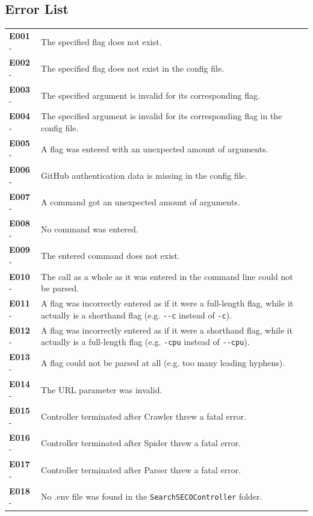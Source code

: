 \documentclass{article}
\begin{document}
\subsection{Error List}
\par \vspace{.5cm}
\begin{tabularx}{\textwidth}{lX}
    \textbf{E001} - & The specified flag does not exist. \\
    \textbf{E002} - & The specified flag does not exist in the config file. \\
    \textbf{E003} - & The specified argument is invalid for its corresponding flag. \\
    \textbf{E004} - & The specified argument is invalid for its corresponding flag in the config file. \\
    \textbf{E005} - & A flag was entered with an unexpected amount of arguments. \\
    \textbf{E006} - & GitHub authentication data is missing in the config file. \\
    \textbf{E007} - & A command got an unexpected amount of arguments. \\
    \textbf{E008} - & No command was entered. \\
    \textbf{E009} - & The entered command does not exist. \\
    \textbf{E010} - & The call as a whole as it was entered in the command line could not be parsed. \\
    \textbf{E011} - & A flag was incorrectly entered as if it were a full-length flag, while it actually is a shorthand flag (e.g. \texttt{-{}-c} instead of \texttt{-c}). \\
    \textbf{E012} - & A flag was incorrectly entered as if it were a shorthand flag, while it actually is a full-length flag (e.g. \texttt{-cpu} instead of \texttt{-{}-cpu}). \\
    \textbf{E013} - & A flag could not be parsed at all (e.g. too many leading hyphens). \\
    \textbf{E014} - & The URL parameter was invalid. \\
    \textbf{E015} - & Controller terminated after Crawler threw a fatal error. \\
    \textbf{E016} - & Controller terminated after Spider threw a fatal error. \\
    \textbf{E017} - & Controller terminated after Parser threw a fatal error. \\
    \textbf{E018} - & No .env file was found in the \texttt{SearchSECOController} folder. \\

\end{tabularx}
\end{document}
